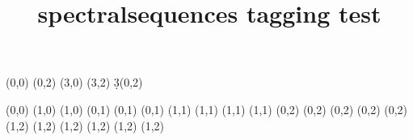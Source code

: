 \documentclass{article}
\title{spectralsequences tagging test}
\begin{document}
\begin{sseqdata}[ name = basic, xscale = 0.6,
cohomological Serre grading ]
\class(0,0)
\class(0,2)
\class(3,0)
\class(3,2)
\d3(0,2)
\end{sseqdata}
\printpage[ name = basic, page = 3 ] \quad
\printpage[ name = basic, page = 4 ]

\begin{sseqpage}[ no axes, ymirror, yscale = 0.8 ]
\class(0,0)
\class(1,0) \class(1,0)
\class(0,1) \class(0,1) \class(0,1)
\class(1,1) \class(1,1) \class(1,1) \class(1,1)
\class(0,2) \class(0,2) \class(0,2) \class(0,2) \class(0,2)
\class(1,2) \class(1,2) \class(1,2) \class(1,2) \class(1,2) \class(1,2)
\end{sseqpage}
\end{document}
